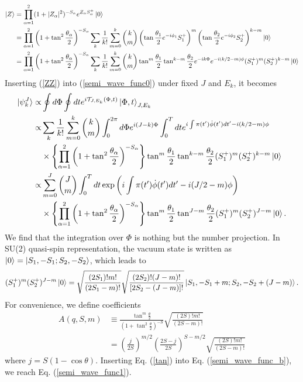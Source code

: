 \documentclass[11pt]{book} %
\begin{document}
\begin{align}
  \ket{Z} &= \prod_{\alpha=1}^2(1+|Z_{\alpha}|^2)^{-S_{\alpha}}e^{Z_{\alpha}S_{\alpha}^{+}}\ket{0} \nonumber \\
  &= \prod_{\alpha=1}^2\left(1+\tan^2{\frac{\theta_{\alpha}}{2}}\right)^{-S_{\alpha}} \sum_k \frac{1}{k!} \sum_{m=0}^k
  \binom{k}{m} \left(
  \tan{\frac{\theta_1}{2}}e^{-i\phi_1}S_1^{+} \right)^m \left(
  \tan{\frac{\theta_2}{2}}e^{-i\phi_2}S_2^{+} \right)^{k-m} \ket{0} \nonumber \\
  &= \prod_{\alpha=1}^2\left(1+\tan^2{\frac{\theta_{\alpha}}{2}}\right)^{-S_{\alpha}} \sum_k \frac{1}{k!} \sum_{m=0}^k
  \binom{k}{m} \tan^m{\frac{\theta_1}{2}}\tan^{k-m}{\frac{\theta_2}{2}}e^{-ik\Phi}e^{-i(k/2-m)\phi}
  (S_1^{+})^m(S_2^{+})^{k-m} \ket{0}
  \label{ZZ}
\end{align}
Inserting (\ref{ZZ}) into (\ref{semi_wave_func0}) under fixed $J$ and $E_k$,
it becomes
\begin{align}
	\ket{\psi_k^J} \propto& \oint d\Phi \oint dt
	e^{i\mathcal{T}_{J,E_k}(\Phi, t)}
	\ket{\Phi,t}_{J,E_k} \nonumber \\
  \propto& \sum_k \frac{1}{k!} \sum_{m=0}^k \binom{k}{m} \int_0^{2\pi} d\Phi e^{i(J-k)\Phi} 
  \int_0^T dt e^{i\int \pi(t') \dot{\phi}(t') dt'-i(k/2-m)\phi} \nonumber \\
  &\times \left\{ \prod_{\alpha=1}^2\left(1+\tan^2{\frac{\theta_{\alpha}}{2}}\right)^{-S_{\alpha}} \right\}
\tan^m{\frac{\theta_1}{2}}\tan^{k-m}\frac{\theta_2}{2}(S_1^{+})^m(S_2^{+})^{k-m} \ket{0} \nonumber \\
  \propto& \sum_{m=0}^{J} \binom{J}{m} \int_0^T dt \exp{\left( i\int \pi(t') \dot{\phi}(t') dt'-i(J/2-m)\phi \right)} \nonumber \\
  &\times \left\{ \prod_{\alpha=1}^2\left(1+\tan^2{\frac{\theta_{\alpha}}{2}}\right)^{-S_{\alpha}} \right\} 
\tan^m{\frac{\theta_1}{2}}\tan^{J-m}\frac{\theta_2}{2} (S_1^{+})^m(S_2^{+})^{J-m} \ket{0} . \label{semi_wave_func_b}
\end{align}
We find that the integration over $\Phi$ is nothing but the number projection.
In SU(2) quasi-spin representation, the vacuum state is written as
$\ket{0}=\ket{S_1,-S_1;S_2,-S_2}$, which leads to
\begin{align}
  (S_1^{+})^m(S_2^{+})^{J-m} \ket{0} 
  = \sqrt{\frac{(2S_1)!m!}{(2S_1-m)!}} \sqrt{\frac{(2S_2)!(J-m)!}{[2S_2-(J-m)]!}}
  \ket{S_1,-S_1+m;S_2,-S_2+(J-m)}.
\end{align}
For convenience, we define coefficients
\begin{align}
  A(q,S,m) &\equiv 
  \frac{\tan^m{\frac{\theta}{2}}}{\left(1+\tan^2{\frac{\theta}{2}}\right)^{-S}}
  \sqrt{\frac{(2S)!m!}{(2S-m)!}}  \nonumber \\
  &= \left(\frac{j}{2S}\right)^{m/2}\left(\frac{2S-j}{2S}\right)^{S-m/2}
 \sqrt{\frac{(2S)!m!}{(2S-m)!}}
\label{tan}
\end{align}
where $j=S(1-\cos{\theta})$.
Inserting Eq. (\ref{tan}) into Eq. (\ref{semi_wave_func_b}),
we reach Eq. (\ref{semi_wave_func1}).
\end{document}
